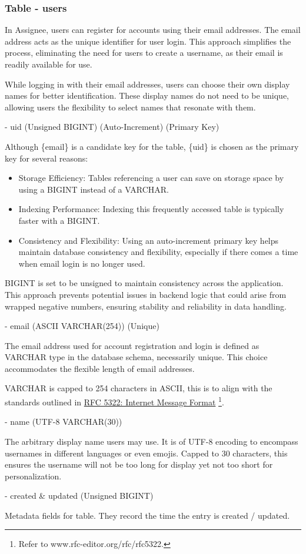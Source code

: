 \documentclass[12pt]{report}
\newcommand{\n}{\par}
\newcommand{\br}{\n\vspace{1 em}\n}
\begin{document}
\subsubsection{Table - users} \label{data-layer.design.user-system.users}
In Assignee, users can register for accounts using their email addresses.
The email address acts as the unique identifier for user login.
This approach simplifies the process, eliminating the need for users to create a username,
as their email is readily available for use.\n
While logging in with their email addresses, users can choose their own display names for better identification.
These display names do not need to be unique, allowing users the flexibility to select names that resonate with them.
\br
- uid (Unsigned BIGINT) (Auto-Increment) (Primary Key)\n
Although \{email\} is a candidate key for the table, \{uid\} is chosen as the primary key for several reasons:\n
\begin{itemize}
	\item Storage Efficiency: Tables referencing a user can save on storage space by using a BIGINT instead of a VARCHAR.
	\item Indexing Performance: Indexing this frequently accessed table is typically faster with a BIGINT.
	\item Consistency and Flexibility: Using an auto-increment primary key helps maintain database consistency and flexibility, especially if there comes a time when email login is no longer used.
\end{itemize}\n
BIGINT is set to be unsigned to maintain consistency across the application.
This approach prevents potential issues in backend logic that could arise from wrapped negative numbers,
ensuring stability and reliability in data handling.
\br
- email (ASCII VARCHAR(254)) (Unique)\n
The email address used for account registration and login is defined as VARCHAR type in the database schema, necessarily unique.
This choice accommodates the flexible length of email addresses.\n
VARCHAR is capped to 254 characters in ASCII, this is to align with the standards outlined in
\href{https://www.rfc-editor.org/rfc/rfc5322}{RFC 5322: Internet Message Format}
\footnote{Refer to www.rfc-editor.org/rfc/rfc5322.}.
\br
- name (UTF-8 VARCHAR(30))\n
The arbitrary display name users may use.
It is of UTF-8 encoding to encompass usernames in different languages or even emojis.
Capped to 30 characters, this ensures the username will not be too long for display yet not too short for personalization.
\br
- created \& updated (Unsigned BIGINT)\n
Metadata fields for table. They record the time the entry is created / updated.\n
\end{document}
